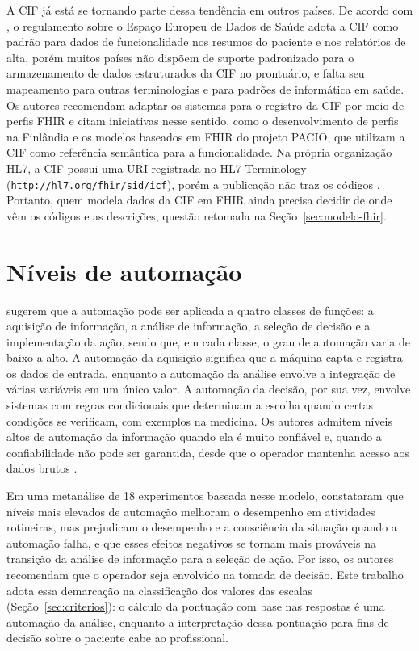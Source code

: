A CIF já está se tornando parte dessa tendência em outros países. De acordo com
, o regulamento sobre o Espaço Europeu de Dados de Saúde adota a CIF como padrão para
dados de funcionalidade nos resumos do paciente e nos relatórios de alta, porém muitos países não dispõem de suporte
padronizado para o armazenamento de dados estruturados da CIF no prontuário, e falta seu mapeamento para outras
terminologias e para padrões de informática em saúde. Os autores recomendam adaptar os sistemas para o registro da
CIF por meio de perfis FHIR e citam iniciativas nesse sentido, como o desenvolvimento de perfis na Finlândia e os
modelos baseados em FHIR do projeto PACIO, que utilizam a CIF como referência semântica para a funcionalidade. Na
própria organização HL7, a CIF possui uma URI registrada no HL7 Terminology (\texttt{http://hl7.org/fhir/sid/icf}),
porém a publicação não traz os códigos \cite{hl7tho2025icf}. Portanto, quem modela dados da CIF em FHIR ainda precisa
decidir de onde vêm os códigos e as descrições, questão retomada na Seção~\ref{sec:modelo-fhir}.

\section{Níveis de automação}
\label{sec:ref-automacao}

 sugerem que a automação pode ser aplicada a quatro classes de funções:
a aquisição de informação, a análise de informação, a seleção de decisão e a implementação da ação, sendo que, em
cada classe, o grau de automação varia de baixo a alto. A automação da aquisição significa que a máquina capta e
registra os dados de entrada, enquanto a automação da análise envolve a integração de várias variáveis em um único
valor. A automação da decisão, por sua vez, envolve sistemas com regras condicionais que determinam a escolha quando
certas condições se verificam, com exemplos na medicina. Os autores admitem níveis altos de automação da informação
quando ela é muito confiável e, quando a confiabilidade não pode ser garantida, desde que o operador mantenha acesso
aos dados brutos \cite[p.~288--289,~292]{parasuraman2000automation}.

Em uma metanálise de 18 experimentos baseada nesse modelo,  constataram que
níveis mais elevados de automação melhoram o desempenho em atividades rotineiras, mas prejudicam o desempenho e a
consciência da situação quando a automação falha, e que esses efeitos negativos se tornam mais prováveis na
transição da análise de informação para a seleção de ação. Por isso, os autores recomendam que o operador seja
envolvido na tomada de decisão. Este trabalho adota essa demarcação na classificação dos valores das escalas
(Seção~\ref{sec:criterios}): o cálculo da pontuação com base nas respostas é uma automação da análise, enquanto a
interpretação dessa pontuação para fins de decisão sobre o paciente cabe ao profissional.


